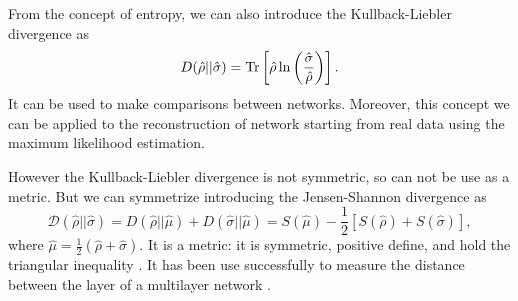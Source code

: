 From the concept of entropy, we can also introduce the Kullback-Liebler divergence as
\begin{equation}
    D(\hat \rho || \hat \sigma) = \operatorname{Tr} \left[\hat \rho \ln\left(\frac{\hat\sigma}{\hat\rho}\right)\right].
\end{equation}
It can be used to make comparisons between networks. Moreover, this concept we can be applied to the reconstruction of network starting from real data using the maximum likelihood estimation.  

However the Kullback-Liebler divergence is not symmetric, so can not be use as a metric. 
But we can symmetrize introducing the Jensen-Shannon divergence as
\begin{equation}
    \mathcal{D}(\hat\rho||\hat\sigma) = D(\hat \rho || \hat \mu) + D(\hat \sigma || \hat \mu) = S(\hat\mu)-\frac{1}{2}\left[S(\hat\rho) + S(\hat\sigma)\right],
\end{equation}
where $\hat\mu =\frac{1}{2}(\hat\rho+\hat\sigma)$. It is a metric: it is symmetric, positive define, and hold the triangular inequality \cite{Jensen-Shannon_divergence}. It has been use successfully to measure the distance between the layer of a multilayer network \cite{multilayer}.